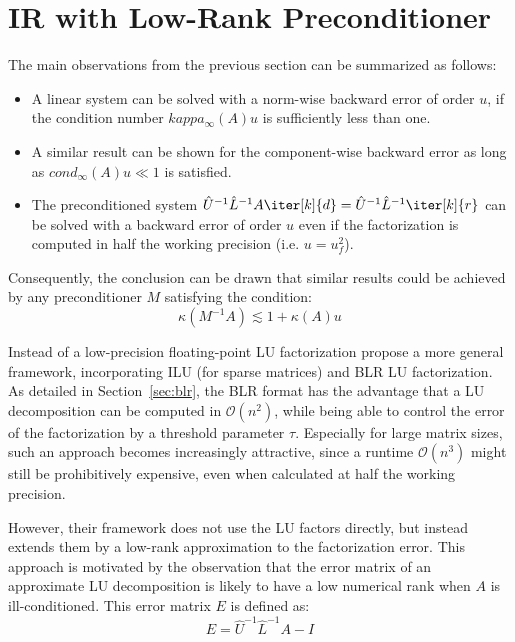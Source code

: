 \section{IR with Low-Rank Preconditioner}
\label{sec:low_rank_ir}

The main observations from the previous section can be summarized as follows:
\begin{itemize}
    \item A linear system can be solved with a norm-wise backward error of order $u$, if the condition number $kappa_\infty(A)u$ is sufficiently less than one.
    \item A similar result can be shown for the component-wise backward error as long as $cond_\infty(A)u \ll 1$ is satisfied.
    \item The preconditioned system $ \hat{U}^{-1}\hat{L}^{-1}A\iter[k]{d}=\hat{U}^{-1}\hat{L}^{-1}\iter[k]{r}$ can be solved with a backward error of order $u$ even if the factorization is computed in half the working precision (i.e. $u=u_f^2$).
\end{itemize}

\noindent Consequently, the conclusion can be drawn that similar results could be achieved by any preconditioner $M$ satisfying the condition:
\begin{equation}
    \kappa(M^{-1}A)\lesssim 1 + \kappa(A)u
\end{equation}

\noindent Instead of a low-precision floating-point LU factorization \cite{higham_new_2019} propose a more general framework, incorporating ILU (for sparse matrices) and BLR LU factorization. As detailed in Section~\hyperref[sec:blr]{\ref{sec:blr}}, the BLR format has the advantage that a LU decomposition can be computed in $\mathcal{O}(n^2)$, while being able to control the error of the factorization by a threshold parameter $\tau$. Especially for large matrix sizes, such an approach becomes increasingly attractive, since a runtime $\mathcal{O}(n^3)$ might still be prohibitively expensive, even when calculated at half the working precision. 

However, their framework does not use the LU factors directly, but instead extends them by a low-rank approximation to the factorization error. This approach is motivated by the observation that the error matrix of an approximate LU decomposition is likely to have a low numerical rank when $A$ is ill-conditioned. This error matrix $E$ is defined as:
\begin{equation}
    E=\hat{U}^{-1}\hat{L}^{-1}A-I
\end{equation}

